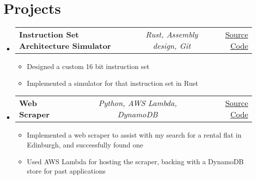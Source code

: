 \documentclass[a4paper,11pt]{article}
\makeatletter
\newcommand{\resumeItem}[1]{
  \item\small{#1}
}
\newcommand{\resumeItemListStart}{\begin{itemize}[rightmargin=0.11in]}
\newcommand{\resumeItemListEnd}{\end{itemize}}
\newcommand{\resumeTrioHeading}[3]{
  \item\small{
    \begin{tabular*}{0.96\textwidth}[t]{
      l@{\extracolsep{\fill}}c@{\extracolsep{\fill}}r
    }
      \textbf{#1} & \textit{#2} & #3
    \end{tabular*}
  }
}
\newcommand{\resumeHeadingListStart}{
  \begin{itemize}[leftmargin=0.15in, label={}]
}
\newcommand{\resumeHeadingListEnd}{\end{itemize}}
\makeatother
\begin{document}

\section{Projects}
  \resumeHeadingListStart{}
    \resumeTrioHeading{Instruction Set Architecture Simulator}{Rust, Assembly design, Git}{\href{https://github.com/TomLonergan03/isa}{\uline{Source Code}}}
      \resumeItemListStart{}
        \resumeItem{Designed a custom 16 bit instruction set}
        \resumeItem{Implemented a simulator for that instruction set in Rust}
      \resumeItemListEnd{}
    \resumeTrioHeading{Web Scraper}{Python, AWS Lambda, DynamoDB}{\href{https://github.com/TomLonergan03/rental-bot}{\uline{Source Code}}}
      \resumeItemListStart{}
        \resumeItem{Implemented a web scraper to assist with my search for a rental flat in Edinburgh, and successfully found one}
        \resumeItem{Used AWS Lambda for hosting the scraper, backing with a DynamoDB store for past applications}
      \resumeItemListEnd{}
  \resumeHeadingListEnd{}



\end{document}
